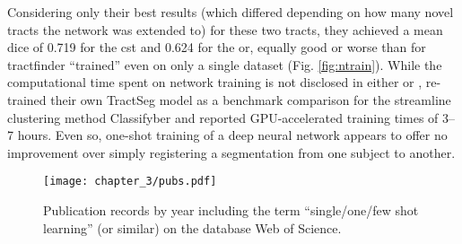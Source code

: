 Considering only their best results (which differed depending on how many novel tracts the network was extended to) for these two tracts, they achieved a mean \gls{dice} of 0.719 for the \gls{cst} and 0.624 for the \gls{or}, equally good or worse than for tractfinder ``trained'' even on only a single dataset (Fig. \ref{fig:ntrain}).
While the computational time spent on network training is not disclosed in either \textcite{Liu2023a} or \textcite{Wasserthal2018}, \textcite{Berto2021} re-trained their own TractSeg model as a benchmark comparison for the streamline clustering method Classifyber and reported GPU-accelerated training times of 3--7 hours.
Even so, one-shot training of a deep neural network appears to offer no improvement over simply registering a segmentation from one subject to another.

\begin{SCfigure}[][h!]
  \centering
  \texttt{[image: chapter\_3/pubs.pdf]}
  \caption[Publications on few-shot learning]{Publication records by year including the term ``single/one/few shot learning'' (or similar) on the database Web of Science.}
  \label{fig:pubs}
\end{SCfigure}

